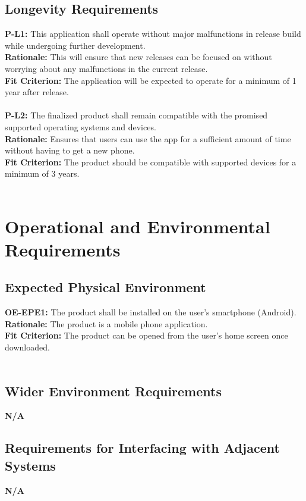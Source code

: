 \documentclass[12pt]{article}
\begin{document}
\subsection{Longevity Requirements}
  \textbf{P-L1:} This application shall operate without major malfunctions in release build while undergoing further development.\\
  \textbf{Rationale:} This will ensure that new releases can be focused on without worrying about any malfunctions in the current release.\\
  \textbf{Fit Criterion:} The application will be expected to operate for a minimum of 1 year after release.\\\\
  \textbf{P-L2:} The finalized product shall remain compatible with the promised supported operating systems and devices.\\
  \textbf{Rationale:} Ensures that users can use the app for a sufficient amount of time without having to get a new phone.\\
  \textbf{Fit Criterion:} The product should be compatible with supported devices for a minimum of 3 years.\\\\

\section{Operational and Environmental Requirements}
\subsection{Expected Physical Environment}
  \textbf{OE-EPE1:} The product shall be installed on the user's smartphone (Android).\\
  \textbf{Rationale:} The product is a mobile phone application.\\
  \textbf{Fit Criterion:} The product can be opened from the user's home screen once downloaded.\\\\

\subsection{Wider Environment Requirements}
  \textbf{N/A}\\

\subsection{Requirements for Interfacing with Adjacent Systems}
  \textbf{N/A}\\
\end{document}

